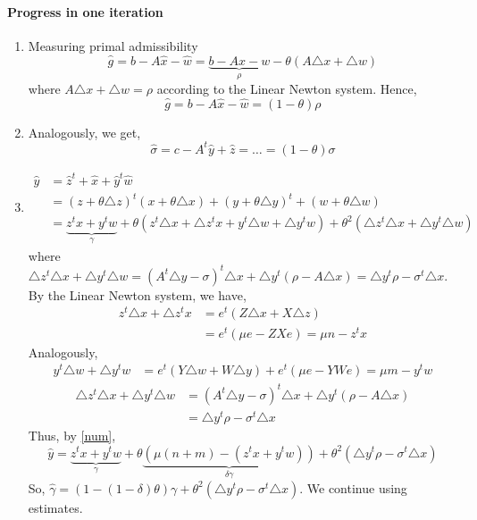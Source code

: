 \documentclass[a4paper]{article}
\numberwithin{lecref}{subsection}
\begin{document}
\paragraph{Progress in one iteration}
\begin{enumerate}
	\item Measuring primal admissibility
		\[ \hat g = b - A \hat x - \hat w = \underbrace{b - Ax - w}_{\rho} - \theta (A\triangle x + \triangle w) \]
		where $A\triangle x + \triangle w = \rho$ according to the Linear Newton system. Hence,
		\[ \hat g = b - A \hat x - \hat w = (1 - \theta) \rho \]
	\item Analogously, we get,
		\[ \hat \sigma = c - A^t \hat y + \hat z = \dots = (1 - \theta) \sigma \]
	\item
		\begin{align}
			\hat y &= \hat z^t + \hat x + \hat y^t \hat w \label{num}\\
				&= (z + \theta \triangle z)^t (x + \theta \triangle x) + (y + \theta \triangle y)^t + (w + \theta \triangle w) \nonumber\\
				&= \underbrace{z^t x + y^t w}_{\gamma} + \theta (z^t \triangle x + \triangle z^t x + y^t \triangle w + \triangle y^t w)
				+ \theta^2 (\triangle z^t \triangle x + \triangle y^t \triangle w) \nonumber
		\end{align}
		where $\triangle z^t \triangle x + \triangle y^t \triangle w = (A^t \triangle y - \sigma)^t \triangle x + \triangle y^t (\rho - A \triangle x) = \triangle y^t \rho - \sigma^t \triangle x$.
		By the Linear Newton system, we have,
		\begin{align*}
			z^t \triangle x + \triangle z^t x &= e^t \left(Z \triangle x + X \triangle z\right) \\
				&= e^t \left(\mu e - ZXe\right) = \mu n - z^t x
		\end{align*}
		Analogously,
		\begin{align*}
			y^t \triangle w + \triangle y^t w &= e^t \left(Y \triangle w + W \triangle y\right) + e^t \left(\mu e - YWe\right) = \mu m - y^t w
		\end{align*}
		\begin{align*}
			\triangle z^t \triangle x + \triangle y^t \triangle w
				&= (A^t \triangle y - \sigma)^t \triangle x + \triangle y^t (\rho - A \triangle x) \\
				&= \triangle y^t \rho - \sigma^t \triangle x
		\end{align*}
		Thus, by \eqref{num},
		\[ \hat y = \underbrace{z^t x + y^t w}_{\gamma} + \theta\underbrace{\left(\mu(n + m) - (z^t x + y^t w)\right)}_{\delta \gamma} + \theta^2 \left(\triangle y^t \rho - \sigma^t \triangle x\right) \]
		So, $\hat\gamma = (1 - (1 - \delta) \theta) \gamma + \theta^2 \left(\triangle y^t \rho - \sigma^t \triangle x\right)$.
		We continue using estimates.


\end{enumerate}
\end{document}
